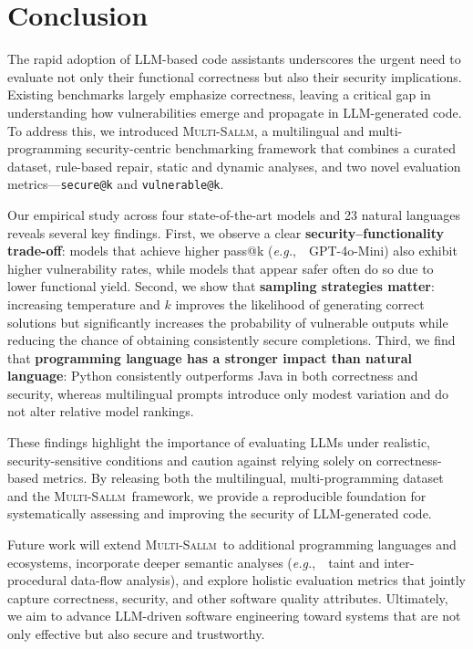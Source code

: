 \documentclass[pdflatex,sn-mathphys-ay]{sn-jnl}
\newcommand{\eg}{\textit{e.g.},\ }
\newcommand{\sandoval}[0]{\textsc{Multi-Sallm}}
\begin{document}
\section{Conclusion}\label{sec:conclusion}

The rapid adoption of LLM-based code assistants underscores the urgent need to evaluate not only their functional correctness but also their security implications. Existing benchmarks largely emphasize correctness, leaving a critical gap in understanding how vulnerabilities emerge and propagate in LLM-generated code. To address this, we introduced \sandoval, a multilingual and multi-programming security-centric benchmarking framework that combines a curated dataset, rule-based repair, static and dynamic analyses, and two novel evaluation metrics—\texttt{secure@k} and \texttt{vulnerable@k}. 

Our empirical study across four state-of-the-art models and 23 natural languages reveals several key findings. First, we observe a clear \textbf{security--functionality trade-off}: models that achieve higher pass@k (\eg~GPT-4o-Mini) also exhibit higher vulnerability rates, while models that appear safer often do so due to lower functional yield. Second, we show that \textbf{sampling strategies matter}: increasing temperature and $k$ improves the likelihood of generating correct solutions but significantly increases the probability of vulnerable outputs while reducing the chance of obtaining consistently secure completions. Third, we find that \textbf{programming language has a stronger impact than natural language}: Python consistently outperforms Java in both correctness and security, whereas multilingual prompts introduce only modest variation and do not alter relative model rankings. 

These findings highlight the importance of evaluating LLMs under realistic, security-sensitive conditions and caution against relying solely on correctness-based metrics. By releasing both the multilingual, multi-programming dataset and the \sandoval~framework, we provide a reproducible foundation for systematically assessing and improving the security of LLM-generated code.

Future work will extend \sandoval~to additional programming languages and ecosystems, incorporate deeper semantic analyses (\eg~taint and inter-procedural data-flow analysis), and explore holistic evaluation metrics that jointly capture correctness, security, and other software quality attributes. Ultimately, we aim to advance LLM-driven software engineering toward systems that are not only effective but also secure and trustworthy.
% 


\end{document}
